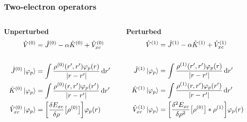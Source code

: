 \begin{frame}
    \frametitle{Two-electron operators}
    \begin{columns}
    \begin{column}[b]{0.4\linewidth}
    \centering
    \textbf{Unperturbed}
    \begin{align}
        \nonumber
        \hat{V}^{(0)} &= \hat{J}^{(0)} -\alpha\hat{K}^{(0)} + \hat{V}_{xc}^{(0)}\\
        \nonumber & \\
        \nonumber
        \hat{J}^{(0)} \ket{\varphi_p} &= \int\frac{\rho^{(0)}(r',r')\varphi_p(r)}{|r-r'|} \,\mathrm{d} r'\\
        \nonumber
        \hat{K}^{(0)} \ket{\varphi_p} &= \int\frac{\rho^{(0)}(r,r')\varphi_p(r')}{|r-r'|} \,\mathrm{d} r'\\
        \nonumber
        \hat{V}_{xc}^{(0)} \ket{\varphi_p} &= \bigg[\frac{\delta E_{xc}}{\delta\rho}\big[\rho^{(0)}\big]\bigg] \varphi_p(r) 
    \end{align}
    \end{column}
    \begin{column}[b]{0.6\linewidth}
    \centering
    \textbf{Perturbed}
    \begin{align}
        \nonumber
        \hat{V}^{(1)} &= \hat{J}^{(1)} -\alpha\hat{K}^{(1)} + \hat{V}_{xc}^{(1)}\\
        \nonumber & \\
        \nonumber
        \hat{J}^{(1)} \ket{\varphi_p} &= \int\frac{\rho^{(1)}(r',r')\varphi_p(r)}{|r-r'|} \,\mathrm{d} r'\\
        \nonumber
        \hat{K}^{(1)} \ket{\varphi_p} &= \int\frac{\rho^{(1)}(r,r')\varphi_p(r')}{|r-r'|} \,\mathrm{d} r'\\
        \nonumber
        \hat{V}_{xc}^{(1)} \ket{\varphi_p} &= \bigg[\frac{\delta^2 E_{xc}}{\delta
        \rho^2}\big[\rho^{(0)}\big]*\rho^{(1)}\bigg] \varphi_p(r) 
    \end{align}
    \end{column}
    \end{columns}

    \vspace{5mm}


\end{frame}
